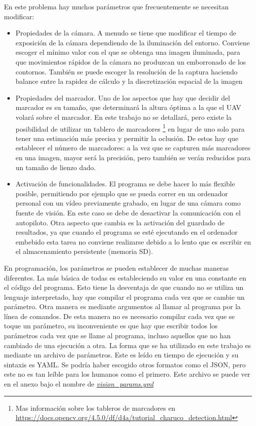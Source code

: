 En este problema hay muchos parámetros que frecuentemente se necesitan modificar:
\begin{itemize}
\item Propiedades de la cámara. A menudo se tiene que modificar el tiempo de exposición de la cámara dependiendo de la iluminación del entorno. Conviene escoger el mínimo valor con el que se obtenga una imagen iluminada, para que movimientos rápidos de la cámara no produzcan un emborronado de los contornos. También se puede escoger la resolución de la captura haciendo balance entre la rapidez de cálculo y la discretización espacial de la imagen 
\item Propiedades del marcador. Uno de los aspectos que hay que decidir del marcador es su tamaño, que determinará la altura óptima a la que el UAV volará sobre el marcador. En este trabajo no se detallará, pero existe la posibilidad de utilizar un tablero de marcadores \footnote{Mas información sobre los tableros de marcadores en  \url{https://docs.opencv.org/4.5.0/df/d4a/tutorial_charuco_detection.html}} en lugar de uno solo para tener una estimación más precisa y permitir la oclusión. De estos hay que establecer el número de marcadores: a la vez que se capturen más marcadores en una imagen, mayor será la precisión, pero también se verán reducidos para un tamaño de lienzo dado.    
\item Activación de funcionalidades. El programa se debe hacer lo más flexible posible, permitiendo por ejemplo que se pueda correr en un ordenador personal con un vídeo previamente grabado, en lugar de una cámara como fuente de visión. En este caso se debe de desactivar la comunicación con el autopiloto. Otra aspecto que cambia es la activación del guardado de resultados, ya que cuando el programa se esté ejecutando en el ordenador embebido esta tarea no conviene realizarse debido a lo lento que es escribir en el almacenamiento persistente (memoria SD).  
\end{itemize}

En programación, los parámetros se pueden establecer de muchas maneras diferentes. La más básica de todas es estableciendo su valor en una constante en el código del programa. Esto tiene la desventaja de que cuando no se utiliza un lenguaje interpretado, hay que compilar el programa cada vez que se cambie un parámetro. Otra manera es mediante argumentos al llamar al programa por la línea de comandos. De esta manera no es necesario compilar cada vez que se toque un parámetro, su inconveniente es que hay que escribir todos los parámetros cada vez que se llame al programa, incluso aquellos que no han cambiado de una ejecución a otra. La forma que se ha utilizado en este trabajo es mediante un archivo de parámetros. Este es leído en tiempo de ejecución  y su sintaxis es YAML. Se podría haber escogido otros formatos como el JSON, pero este no es tan leíble para los humanos como el primero. Este archivo se puede ver en el anexo bajo el nombre de \hyperref[sec:vision-params]{\textit{vision\_params.yml}} 

